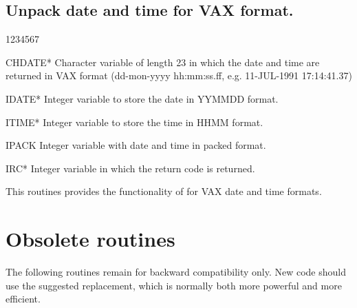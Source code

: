 \subsection{Unpack date and time for VAX format.}
\begin{DLtt}{1234567}
\item[CHDATE*]
Character variable of length 23 in which the date and time
are returned 
in VAX format (dd-mon-yyyy hh:mm:ss.ff, e.g. 11-JUL-1991 17:14:41.37)
\item[IDATE*]
Integer variable to store the date in YYMMDD format.
\item[ITIME*]
Integer variable to store the time in HHMM format.
\item[IPACK]
Integer variable with date and time in packed format.
\item[IRC*]
Integer variable in which the return code is returned.
\end{DLtt}
\par
This routines provides the functionality of 
 for VAX date and time formats.
\section{Obsolete routines}
The following routines remain for backward compatibility only.
New code should use the suggested replacement, which is
normally both more powerful and more efficient.
